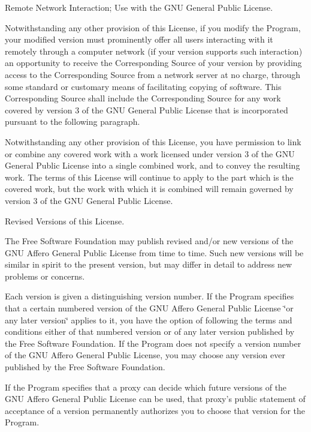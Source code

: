 \begin{DoxyEnumerate}
\item Remote Network Interaction; Use with the G\-N\-U General Public License.
\end{DoxyEnumerate}

Notwithstanding any other provision of this License, if you modify the Program, your modified version must prominently offer all users interacting with it remotely through a computer network (if your version supports such interaction) an opportunity to receive the Corresponding Source of your version by providing access to the Corresponding Source from a network server at no charge, through some standard or customary means of facilitating copying of software. This Corresponding Source shall include the Corresponding Source for any work covered by version 3 of the G\-N\-U General Public License that is incorporated pursuant to the following paragraph.

Notwithstanding any other provision of this License, you have permission to link or combine any covered work with a work licensed under version 3 of the G\-N\-U General Public License into a single combined work, and to convey the resulting work. The terms of this License will continue to apply to the part which is the covered work, but the work with which it is combined will remain governed by version 3 of the G\-N\-U General Public License.


\begin{DoxyEnumerate}
\item Revised Versions of this License.
\end{DoxyEnumerate}

The Free Software Foundation may publish revised and/or new versions of the G\-N\-U Affero General Public License from time to time. Such new versions will be similar in spirit to the present version, but may differ in detail to address new problems or concerns.

Each version is given a distinguishing version number. If the Program specifies that a certain numbered version of the G\-N\-U Affero General Public License \char`\"{}or any later version\char`\"{} applies to it, you have the option of following the terms and conditions either of that numbered version or of any later version published by the Free Software Foundation. If the Program does not specify a version number of the G\-N\-U Affero General Public License, you may choose any version ever published by the Free Software Foundation.

If the Program specifies that a proxy can decide which future versions of the G\-N\-U Affero General Public License can be used, that proxy's public statement of acceptance of a version permanently authorizes you to choose that version for the Program.

